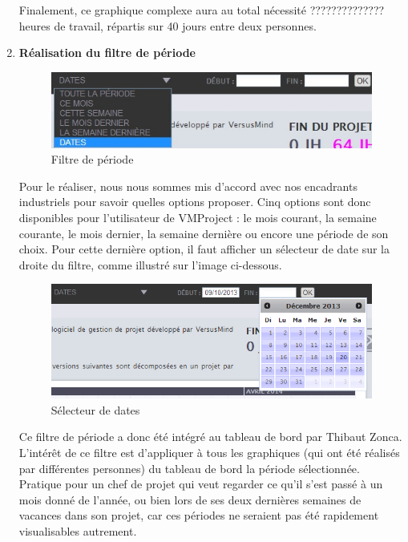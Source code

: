 \documentclass[12pt]{report}
\begin{document}
\begin{enumerate}
Finalement, ce graphique complexe aura au total nécessité ?????????????? heures de travail, répartis sur 40 jours entre deux personnes.\\




\item \textbf{Réalisation du filtre de période}

\begin{figure}[H]
	\centering
	\includegraphics[width=1\textwidth]{pictures/realisations/filtrePeriode.jpg}
	\caption{Filtre de période}
	\label{21}
\end{figure}

Pour le réaliser, nous nous sommes mis d'accord avec nos encadrants industriels pour savoir quelles options proposer. Cinq options sont donc disponibles pour l'utilisateur de VMProject : le mois courant, la semaine courante, le mois dernier, la semaine dernière ou encore une période de son choix. Pour cette dernière option, il faut afficher un sélecteur de date sur la droite du filtre, comme illustré sur l'image ci-dessous.\\

\begin{figure}[H]
	\centering
	\includegraphics[width=1\textwidth]{pictures/realisations/filtrePeriodeDatepicker.png}
	\caption{Sélecteur de dates}
	\label{22}
\end{figure}

Ce filtre de période a donc été intégré au tableau de bord par Thibaut Zonca. L'intérêt de ce filtre est d'appliquer à tous les graphiques (qui ont été réalisés par différentes personnes) du tableau de bord la période sélectionnée. Pratique pour un chef de projet qui veut regarder ce qu'il s'est passé à un mois donné de l'année, ou bien lors de ses deux dernières semaines de vacances dans son projet, car ces périodes ne seraient pas été rapidement visualisables autrement.\\


\end{enumerate}
\end{document}
